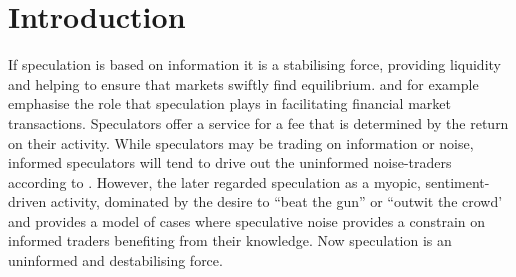 \documentclass[ijfs,article,submit,oneauthor,pdftex,10pt,a4paper]{mdpi}
\begin{document}
\section{Introduction}
If speculation is based on information it is a stabilising force, providing liquidity and helping to ensure that markets swiftly find equilibrium. \citet{KeynesHedge} and \citet{HicksHedge} for example emphasise the role that speculation plays in facilitating financial market transactions. Speculators offer a service for a fee that is determined by the return on their activity.  While speculators may be trading on information or noise, informed speculators will tend to drive out the uninformed noise-traders according to \citet{FriedmanPositive}.   However, the later \citet[p. 101]{Keynes1936} regarded speculation as a myopic, sentiment-driven activity, dominated by the desire to ``beat the gun'' or  ``outwit the crowd' and \citet{Delong1990noise} provides a model of cases where speculative noise provides a constrain on informed traders benefiting from their knowledge. Now speculation is an uninformed and destabilising force.  
\end{document}
